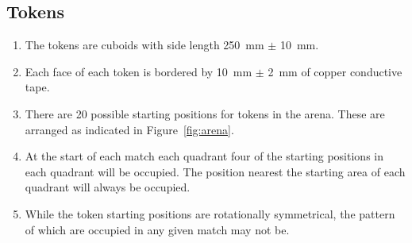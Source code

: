 \subsection{Tokens}
\label{spec:tokens}

\begin{enumerate}
  \item The tokens are cuboids with side length \SI{250}{mm} $\pm$ \SI{10}{mm}.
  \item Each face of each token is bordered by \SI{10}{mm} $\pm$ \SI{2}{mm} of
        copper conductive tape.
  \item There are 20 possible starting positions for tokens in the arena. These
        are arranged as indicated in Figure~\ref{fig:arena}.
  \item At the start of each match each quadrant four of the starting positions
        in each quadrant will be occupied. The position nearest the starting
        area of each quadrant will always be occupied.
  \item While the token starting positions are rotationally symmetrical, the
        pattern of which are occupied in any given match may not be.
\end{enumerate}
